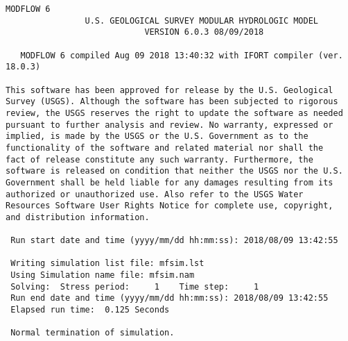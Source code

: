 {\small
\begin{lstlisting}[style=modeloutput]
                                   MODFLOW 6
                U.S. GEOLOGICAL SURVEY MODULAR HYDROLOGIC MODEL
                            VERSION 6.0.3 08/09/2018

   MODFLOW 6 compiled Aug 09 2018 13:40:32 with IFORT compiler (ver. 18.0.3)

This software has been approved for release by the U.S. Geological
Survey (USGS). Although the software has been subjected to rigorous
review, the USGS reserves the right to update the software as needed
pursuant to further analysis and review. No warranty, expressed or
implied, is made by the USGS or the U.S. Government as to the
functionality of the software and related material nor shall the
fact of release constitute any such warranty. Furthermore, the
software is released on condition that neither the USGS nor the U.S.
Government shall be held liable for any damages resulting from its
authorized or unauthorized use. Also refer to the USGS Water
Resources Software User Rights Notice for complete use, copyright,
and distribution information.

 Run start date and time (yyyy/mm/dd hh:mm:ss): 2018/08/09 13:42:55

 Writing simulation list file: mfsim.lst
 Using Simulation name file: mfsim.nam
 Solving:  Stress period:     1    Time step:     1
 Run end date and time (yyyy/mm/dd hh:mm:ss): 2018/08/09 13:42:55
 Elapsed run time:  0.125 Seconds

 Normal termination of simulation.

\end{lstlisting}
}
